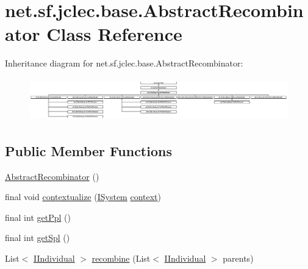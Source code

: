 \hypertarget{classnet_1_1sf_1_1jclec_1_1base_1_1_abstract_recombinator}{\section{net.\-sf.\-jclec.\-base.\-Abstract\-Recombinator Class Reference}
\label{classnet_1_1sf_1_1jclec_1_1base_1_1_abstract_recombinator}
}
Inheritance diagram for net.\-sf.\-jclec.\-base.\-Abstract\-Recombinator\-:\begin{figure}[H]
\begin{center}
\leavevmode
\includegraphics[height=1.876833cm]{classnet_1_1sf_1_1jclec_1_1base_1_1_abstract_recombinator}
\end{center}
\end{figure}
\subsection*{Public Member Functions}
\begin{DoxyCompactItemize}
\item 
\hyperlink{classnet_1_1sf_1_1jclec_1_1base_1_1_abstract_recombinator_ae14b57d058c733a0b53244135e20f8f6}{Abstract\-Recombinator} ()
\item 
final void \hyperlink{classnet_1_1sf_1_1jclec_1_1base_1_1_abstract_recombinator_aa07502c99a8d181ac13d69d464bbd703}{contextualize} (\hyperlink{interfacenet_1_1sf_1_1jclec_1_1_i_system}{I\-System} \hyperlink{classnet_1_1sf_1_1jclec_1_1base_1_1_abstract_recombinator_a580de9e9511dbb1d9042eb1089e767a7}{context})
\item 
final int \hyperlink{classnet_1_1sf_1_1jclec_1_1base_1_1_abstract_recombinator_aacb99468526b391800cca57f1f8a5df3}{get\-Ppl} ()
\item 
final int \hyperlink{classnet_1_1sf_1_1jclec_1_1base_1_1_abstract_recombinator_a36463c68ebe030a7ff428fe81611ca80}{get\-Spl} ()
\item 
List$<$ \hyperlink{interfacenet_1_1sf_1_1jclec_1_1_i_individual}{I\-Individual} $>$ \hyperlink{classnet_1_1sf_1_1jclec_1_1base_1_1_abstract_recombinator_a5f4024acbf65e43bdfa7844dc23731cd}{recombine} (List$<$ \hyperlink{interfacenet_1_1sf_1_1jclec_1_1_i_individual}{I\-Individual} $>$ parents)
\end{DoxyCompactItemize}
